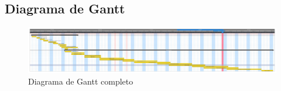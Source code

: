 \appendix
\begin{landscape}
	\section{Diagrama de Gantt}
	\begin{figure}[H]
		\centering
		\includegraphics[width=1.7\textwidth]{images/plano_de_trabalho/gannt_0.png}
	 	\caption{Diagrama de Gantt completo}
	 	\label{fig: workplan0}
	\end{figure}
\end{landscape}
